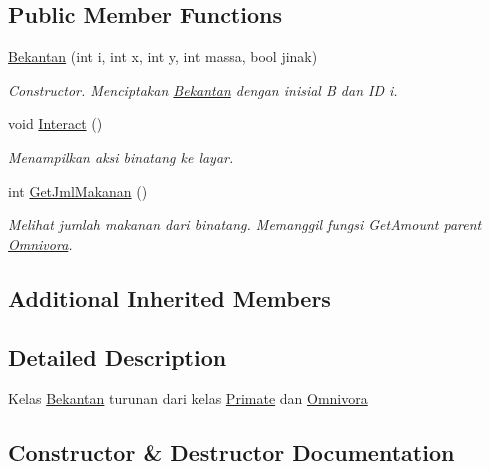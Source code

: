 \subsection*{Public Member Functions}
\begin{DoxyCompactItemize}
\item 
\hyperlink{classBekantan_a00fa93f38b1aca4a25a989b495d45da1}{Bekantan} (int i, int x, int y, int massa, bool jinak)
\begin{DoxyCompactList}\small\item\em Constructor. Menciptakan \hyperlink{classBekantan}{Bekantan} dengan inisial \textquotesingle{}B\textquotesingle{} dan ID i. \end{DoxyCompactList}\item 
void \hyperlink{classBekantan_a1a21f2ea48a5c5ede8b988ce7a675468}{Interact} ()\hypertarget{classBekantan_a1a21f2ea48a5c5ede8b988ce7a675468}{}\label{classBekantan_a1a21f2ea48a5c5ede8b988ce7a675468}

\begin{DoxyCompactList}\small\item\em Menampilkan aksi binatang ke layar. \end{DoxyCompactList}\item 
int \hyperlink{classBekantan_a84c8ea3d97bd95d0c108d4016b5be934}{Get\+Jml\+Makanan} ()
\begin{DoxyCompactList}\small\item\em Melihat jumlah makanan dari binatang. Memanggil fungsi Get\+Amount parent \hyperlink{classOmnivora}{Omnivora}. \end{DoxyCompactList}\end{DoxyCompactItemize}
\subsection*{Additional Inherited Members}


\subsection{Detailed Description}
Kelas \hyperlink{classBekantan}{Bekantan} turunan dari kelas \hyperlink{classPrimate}{Primate} dan \hyperlink{classOmnivora}{Omnivora} 

\subsection{Constructor \& Destructor Documentation}
